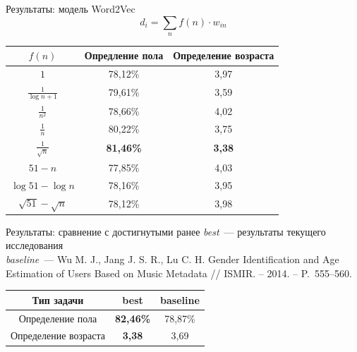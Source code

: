 \documentclass{beamer}
\newcommand{\prevGender}{78,87\%}
\newcommand{\prevAge}{3,69}
\newcommand{\bestGender}{82,46\%}
\newcommand{\bestAge}{3,38}
\begin{document}
\begin{frame}{Результаты: модель Word2Vec}
    \[d_{i} = \sum_{n}{f(n) \cdot w_{in}}\]
    \begin{table}[h!]
    \centering
    \begin{tabular}{|c|c|c|}
    \hline
    \boldmath$f(n)$ & \textbf{Опредление пола} & \textbf{Определение возраста} \tabularnewline
    \hline
    $1$ & 78,12\% & 3,97 \tabularnewline
    \hline
    $\frac{1}{\log{n + 1}}$ & 79,61\% & 3,59 \tabularnewline
    \hline
    $\frac{1}{n^2}$ & 78,66\% & 4,02 \tabularnewline
    \hline
    $\frac{1}{n}$ & 80,22\% & 3,75 \tabularnewline
    \hline
    $\frac{1}{\sqrt{n}}$ & \textbf{81,46\%} & \textbf{3,38} \tabularnewline
    \hline
    $51 - n$ & 77,85\% & 4,03 \tabularnewline
    \hline
    $\log{51} - \log{n}$ & 78,16\% & 3,95 \tabularnewline
    \hline
    $\sqrt{51} - \sqrt{n}$ & 78,12\% & 3,98 \tabularnewline
    \hline
    \end{tabular}
    \label{tab:doc2vec_results}
    \end{table}
\end{frame}

\begin{frame}{Результаты: сравнение с достигнутыми ранее}
    \textit{best}~--- результаты текущего исследования \\
    \textit{baseline}~--- Wu M. J.,
        Jang J. S. R., Lu C. H. Gender Identification
        and Age Estimation of Users Based on Music 
        Metadata // ISMIR. – 2014. – P.~555--560.
    \begin{table}[h!]
    \centering
    \begin{tabular}{|c|c|c|}
    \hline
    \textbf{Тип задачи} & \textbf{best} & \textbf{baseline} \tabularnewline
    \hline
    Определение пола & \textbf{\bestGender} & \prevGender \tabularnewline
    \hline
    Определение возраста & \textbf{\bestAge} & \prevAge \tabularnewline
    \hline
    \end{tabular}
    \label{tab:total_results}
    \end{table}
\end{frame}

\begin{frame}
    \titlepage
\end{frame}
\end{document}
